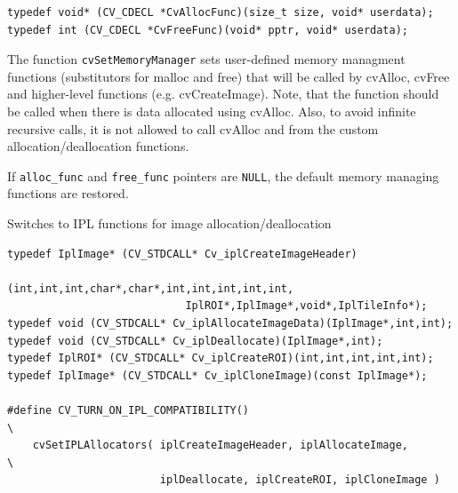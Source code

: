 \begin{lstlisting}
typedef void* (CV_CDECL *CvAllocFunc)(size_t size, void* userdata);
typedef int (CV_CDECL *CvFreeFunc)(void* pptr, void* userdata);
\end{lstlisting}


\begin{description}
\end{description}

The function \texttt{cvSetMemoryManager} sets user-defined memory
managment functions (substitutors for malloc and free) that will be called
by cvAlloc, cvFree and higher-level functions (e.g. cvCreateImage). Note,
that the function should be called when there is data allocated using
cvAlloc. Also, to avoid infinite recursive calls, it is not
allowed to call cvAlloc and  from the custom
allocation/deallocation functions.

If \texttt{alloc\_func} and \texttt{free\_func} pointers are
\texttt{NULL}, the default memory managing functions are restored.

\label{SetIPLAllocators}

Switches to IPL functions for image allocation/deallocation

\begin{lstlisting}
typedef IplImage* (CV_STDCALL* Cv_iplCreateImageHeader)
                            (int,int,int,char*,char*,int,int,int,int,int,
                            IplROI*,IplImage*,void*,IplTileInfo*);
typedef void (CV_STDCALL* Cv_iplAllocateImageData)(IplImage*,int,int);
typedef void (CV_STDCALL* Cv_iplDeallocate)(IplImage*,int);
typedef IplROI* (CV_STDCALL* Cv_iplCreateROI)(int,int,int,int,int);
typedef IplImage* (CV_STDCALL* Cv_iplCloneImage)(const IplImage*);

#define CV_TURN_ON_IPL_COMPATIBILITY()                                  \
    cvSetIPLAllocators( iplCreateImageHeader, iplAllocateImage,         \
                        iplDeallocate, iplCreateROI, iplCloneImage )
\end{lstlisting}

